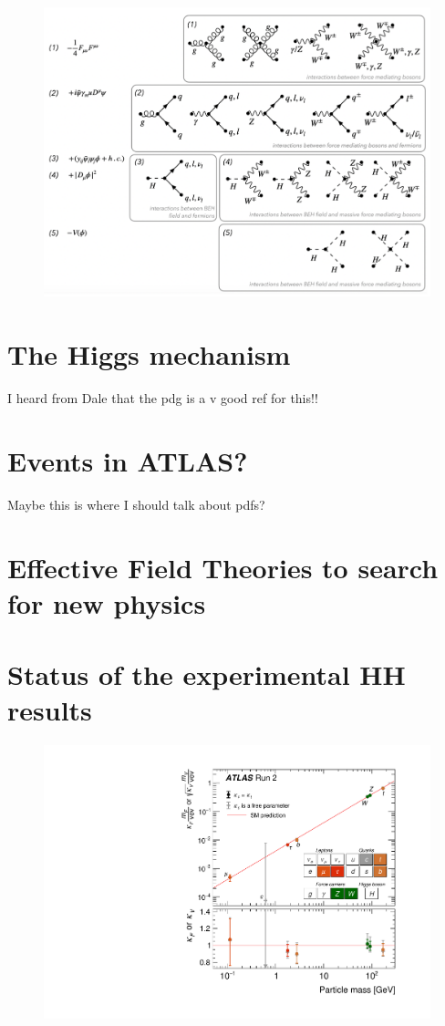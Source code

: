 \begin{figure}
\centering
\includegraphics[width=\textwidth]{figures/intro/mel-sm-diagrams.png}
\caption{\cite{Melissa-thesis}}
\label{fig:mel-sm}
\end{figure}

\section{The Higgs mechanism}
I heard from Dale that the pdg is a v good ref for this!!

\section{Events in ATLAS?}

Maybe this is where I should talk about pdfs?

\section{Effective Field Theories to search for new physics}

\section{Status of the experimental HH results}

\begin{figure}
\centering
\includegraphics[width=.7\textwidth]{figures/intro/atlas-nature-10yrs/fig_05}
\caption{\cite{2207.00092}}
\label{fig:pcle-mass-atlas}
\end{figure}


